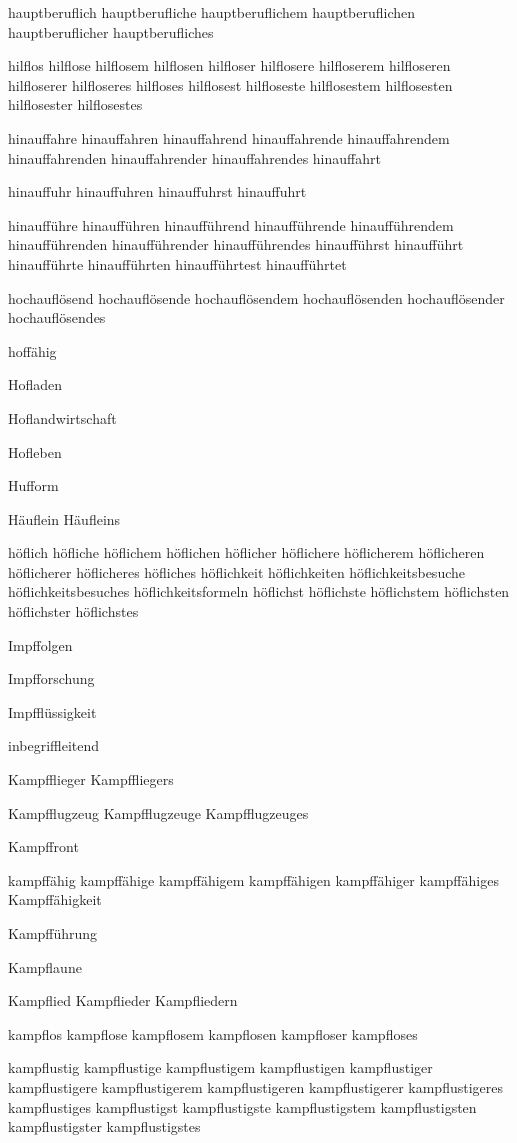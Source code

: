 hauptberuflich hauptberufliche hauptberuflichem hauptberuflichen hauptberuflicher hauptberufliches

hilflos hilflose hilflosem hilflosen hilfloser hilflosere hilfloserem hilfloseren hilfloserer hilfloseres hilfloses hilflosest hilfloseste hilflosestem hilflosesten hilflosester hilflosestes

hinauffahre hinauffahren hinauffahrend hinauffahrende hinauffahrendem hinauffahrenden hinauffahrender hinauffahrendes hinauffahrt

hinauffuhr hinauffuhren hinauffuhrst hinauffuhrt

hinaufführe hinaufführen hinaufführend hinaufführende hinaufführendem hinaufführenden hinaufführender hinaufführendes hinaufführst hinaufführt hinaufführte hinaufführten hinaufführtest hinaufführtet

hochauflösend hochauflösende hochauflösendem hochauflösenden hochauflösender hochauflösendes

hoffähig

Hofladen

Hoflandwirtschaft

Hofleben

Hufform

Häuflein Häufleins

höflich höfliche höflichem höflichen höflicher höflichere höflicherem höflicheren höflicherer höflicheres höfliches höflichkeit höflichkeiten höflichkeitsbesuche höflichkeitsbesuches höflichkeitsformeln höflichst höflichste höflichstem höflichsten höflichster höflichstes

Impffolgen

Impfforschung

Impfflüssigkeit

inbegriffleitend 

Kampfflieger Kampffliegers

Kampfflugzeug Kampfflugzeuge Kampfflugzeuges

Kampffront

kampffähig kampffähige kampffähigem kampffähigen kampffähiger kampffähiges Kampffähigkeit

Kampfführung

Kampflaune

Kampflied Kampflieder Kampfliedern

kampflos kampflose kampflosem kampflosen kampfloser kampfloses

kampflustig kampflustige kampflustigem kampflustigen kampflustiger kampflustigere kampflustigerem kampflustigeren kampflustigerer kampflustigeres kampflustiges kampflustigst kampflustigste kampflustigstem kampflustigsten kampflustigster kampflustigstes

